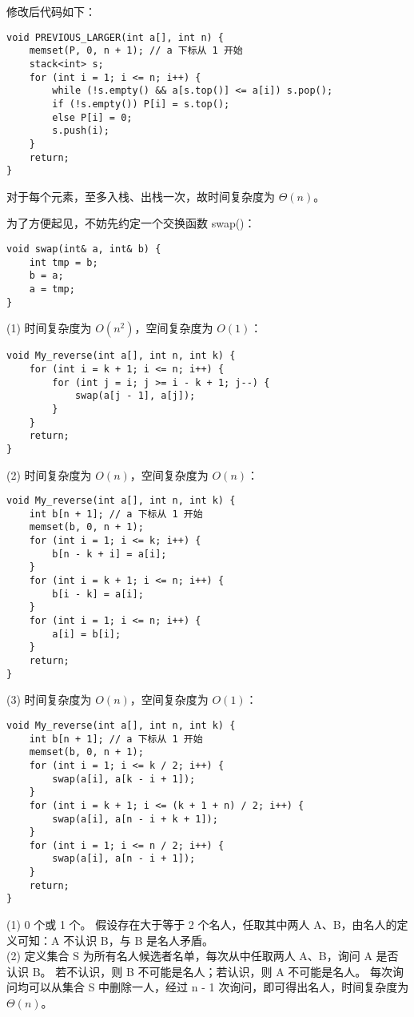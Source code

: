 \documentclass[12pt, a4paper, oneside]{ctexart}
\begin{document}
\newpage
\begin{solution}[3.5]
修改后代码如下：
\begin{verbatim}
void PREVIOUS_LARGER(int a[], int n) {
    memset(P, 0, n + 1); // a 下标从 1 开始
    stack<int> s;
    for (int i = 1; i <= n; i++) {
        while (!s.empty() && a[s.top()] <= a[i]) s.pop();
        if (!s.empty()) P[i] = s.top();
        else P[i] = 0;
        s.push(i);
    }
    return;
}
\end{verbatim}

对于每个元素，至多入栈、出栈一次，故时间复杂度为 $\Theta(n)$。
\end{solution}

\begin{solution}[3.6]
为了方便起见，不妨先约定一个交换函数 swap()：
\begin{verbatim}
void swap(int& a, int& b) {
    int tmp = b;
    b = a;
    a = tmp;
}
\end{verbatim}
\newpage
(1) 时间复杂度为 $O(n^2)$，空间复杂度为 $O(1)$：
\begin{verbatim}
void My_reverse(int a[], int n, int k) {
    for (int i = k + 1; i <= n; i++) {
        for (int j = i; j >= i - k + 1; j--) {
            swap(a[j - 1], a[j]);
        }
    }
    return;
}
\end{verbatim}
(2) 时间复杂度为 $O(n)$，空间复杂度为 $O(n)$：
\begin{verbatim}
void My_reverse(int a[], int n, int k) {
    int b[n + 1]; // a 下标从 1 开始
    memset(b, 0, n + 1);
    for (int i = 1; i <= k; i++) {
        b[n - k + i] = a[i]; 
    }
    for (int i = k + 1; i <= n; i++) {
        b[i - k] = a[i];
    }
    for (int i = 1; i <= n; i++) {
        a[i] = b[i];
    }
    return;
}
\end{verbatim}
\newpage
(3) 时间复杂度为 $O(n)$，空间复杂度为 $O(1)$：
\begin{verbatim}
void My_reverse(int a[], int n, int k) {
    int b[n + 1]; // a 下标从 1 开始
    memset(b, 0, n + 1);
    for (int i = 1; i <= k / 2; i++) {
        swap(a[i], a[k - i + 1]);
    }
    for (int i = k + 1; i <= (k + 1 + n) / 2; i++) {
        swap(a[i], a[n - i + k + 1]);
    }
    for (int i = 1; i <= n / 2; i++) {
        swap(a[i], a[n - i + 1]);
    }
    return;
}
\end{verbatim}
\end{solution}

\begin{solution}[3.8]
(1) 0 个或 1 个。
假设存在大于等于 2 个名人，任取其中两人 A、B，由名人的定义可知：A 不认识 B，与 B 是名人矛盾。
\\(2) 定义集合 S 为所有名人候选者名单，每次从中任取两人 A、B，询问 A 是否认识 B。
若不认识，则 B 不可能是名人；若认识，则 A 不可能是名人。
每次询问均可以从集合 S 中删除一人，经过 n - 1 次询问，即可得出名人，时间复杂度为 $\Theta(n)$。
\end{solution}
\end{document}
